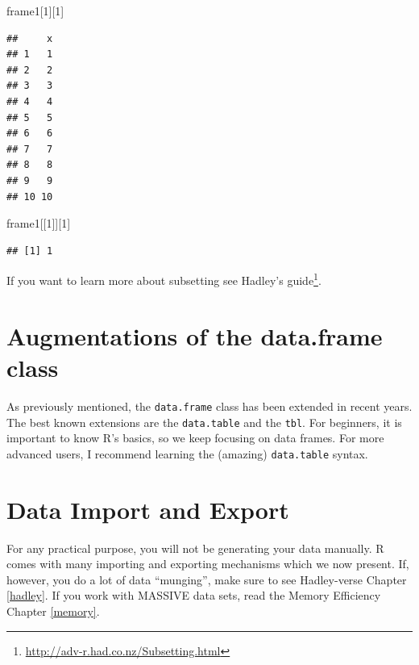 \documentclass[]{book}
\newenvironment{Shaded}{\begin{snugshade}}{\end{snugshade}}
\newcommand{\DecValTok}[1]{\textcolor[rgb]{0.00,0.00,0.81}{#1}}
\newcommand{\NormalTok}[1]{#1}
\renewcommand{\href}[2]{#2\footnote{\url{#1}}}
\theoremstyle{definition}
\theoremstyle{definition}
\theoremstyle{definition}
\theoremstyle{remark}
\begin{document}
\begin{Shaded}
\begin{Highlighting}[]
\NormalTok{frame1[}\DecValTok{1}\NormalTok{][}\DecValTok{1}\NormalTok{]}
\end{Highlighting}
\end{Shaded}

\begin{verbatim}
##     x
## 1   1
## 2   2
## 3   3
## 4   4
## 5   5
## 6   6
## 7   7
## 8   8
## 9   9
## 10 10
\end{verbatim}

\begin{Shaded}
\begin{Highlighting}[]
\NormalTok{frame1[[}\DecValTok{1}\NormalTok{]][}\DecValTok{1}\NormalTok{]}
\end{Highlighting}
\end{Shaded}

\begin{verbatim}
## [1] 1
\end{verbatim}

If you want to learn more about subsetting see \href{http://adv-r.had.co.nz/Subsetting.html}{Hadley's guide}.

\hypertarget{augmentations-of-the-data.frame-class}{%
\section{Augmentations of the data.frame class}\label{augmentations-of-the-data.frame-class}}

As previously mentioned, the \texttt{data.frame} class has been extended in recent years.
The best known extensions are the \texttt{data.table} and the \texttt{tbl}.
For beginners, it is important to know R's basics, so we keep focusing on data frames.
For more advanced users, I recommend learning the (amazing) \texttt{data.table} syntax.

\hypertarget{data-import-and-export}{%
\section{Data Import and Export}\label{data-import-and-export}}

For any practical purpose, you will not be generating your data manually.
R comes with many importing and exporting mechanisms which we now present.
If, however, you do a lot of data ``munging'', make sure to see Hadley-verse Chapter \ref{hadley}.
If you work with MASSIVE data sets, read the Memory Efficiency Chapter \ref{memory}.
\end{document}

